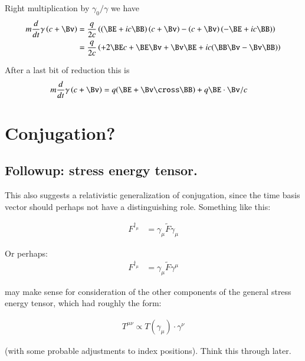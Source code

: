 \documentclass{article}
\begin{document}
Right multiplication by $\gamma_0/\gamma$ we have
\begin{align*}
m \frac{d}{dt} \gamma \left(c + \Bv \right) 
&= \frac{q }{2c} \left( (\BE + i c\BB) \left(c + \Bv \right) -\left(c + \Bv \right) (-\BE + i c\BB) \right) \\
&= \frac{q }{2c} \left( 
+ 2 \BE c 
+ \BE \Bv  + \Bv \BE 
+ i c (\BB \Bv  - \Bv \BB)
\right) \\
\end{align*}

After a last bit of reduction this is
\begin{align}
m \frac{d}{dt} \gamma \left(c + \Bv \right) &= q (\BE + \Bv \cross \BB) + q \BE \cdot \Bv/c
\end{align}


\section{ Conjugation? }
\subsection{ Followup: stress energy tensor. }

This also suggests a relativistic generalization of conjugation, since the time basis vector should perhaps not have
a distinguishing role.  Something like this:

\begin{align*}
F^{\dagger_\mu} &= \gamma_\mu \tilde{F} \gamma_\mu
\end{align*}

Or perhaps:
\begin{align*}
F^{\dagger_\mu} &= \gamma_\mu \tilde{F} \gamma^\mu
\end{align*}

may make sense for consideration of the other components of the general stress energy tensor, which had roughly the form:

\begin{align*}
T^{\mu\nu} \propto T(\gamma_\mu) \cdot \gamma^\nu
\end{align*}

(with some probable adjustments to index positions).  Think this through later.



\end{document}
